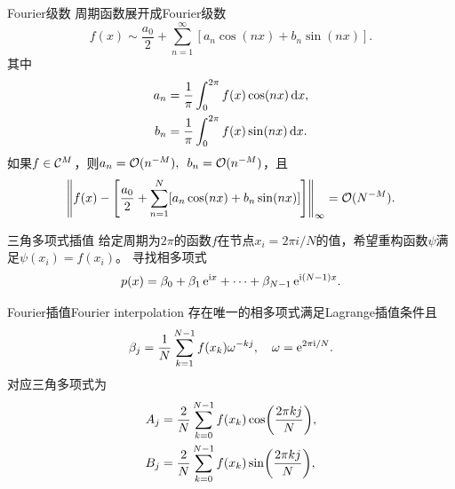 \begin{definition}
    {Fourier级数}{}
    周期函数展开成Fourier级数
    \begin{equation}
        f(x)\sim\frac{a_0}2+\sum_{n=1}^\infty[a_n\cos(nx)+b_n\sin(nx)].
    \end{equation}
    其中
    \begin{subequations}
        \begin{align}
            a_n&=\frac1\pi\int_0^{2\pi}f(x)\cos(nx)\mathop{}\!\mathrm{d} x,\\
            b_n&=\frac1\pi\int_0^{2\pi}f(x)\sin(nx)\mathop{}\!\mathrm{d} x.
        \end{align}
    \end{subequations}
    \tcblower
    如果$f\in\mathcal C^M$，则$a_n=\mathcal O(n^{-M}),\enspace b_n=\mathcal O(n^{-M})$，且
    \[
        \left\lVert f(x)-\left[\frac{a_0}2+\sum_{n=1}^N[a_n\cos(nx)+b_n\sin(nx)]\right]\right\rVert_\infty=\mathcal O(N^{-M}).
    \] 
\end{definition}

\begin{definition}
    {三角多项式插值}{}
    给定周期为$2\pi$的函数$f$在节点$x_i=2\pi i/N$的值，希望重构函数$\psi$满足$\psi(x_i)=f(x_i)$。
    \tcblower
    寻找相多项式
    \begin{equation}
        p(x)=\beta_0+\beta_1\mathop{}\!\mathrm{e}^{\mathrm{i} x}+\cdots+\beta_{N-1}\mathop{}\!\mathrm{e}^{\mathrm{i}(N-1)x}.
    \end{equation}
\end{definition}

\begin{theorem}
    {Fourier插值}{Fourier interpolation}
    存在唯一的相多项式满足Lagrange插值条件且
    \begin{equation}
        \label{eqn:Fourier betaj}
        \beta_j=\frac1N\sum_{k=1}^{N-1}f(x_k)\omega^{-kj},\quad\omega=\mathop{}\!\mathrm{e}^{2\pi\mathrm{i}/N}.
    \end{equation}
    对应三角多项式为
    \begin{subequations}
        \begin{align}
            A_j&=\frac2N\sum_{k=0}^{N-1}f(x_k)\cos\biggl(\frac{2\pi kj}N\biggr),\\
            B_j&=\frac2N\sum_{k=0}^{N-1}f(x_k)\sin\biggl(\frac{2\pi kj}N\biggr),
        \end{align}
    \end{subequations}
\end{theorem}

